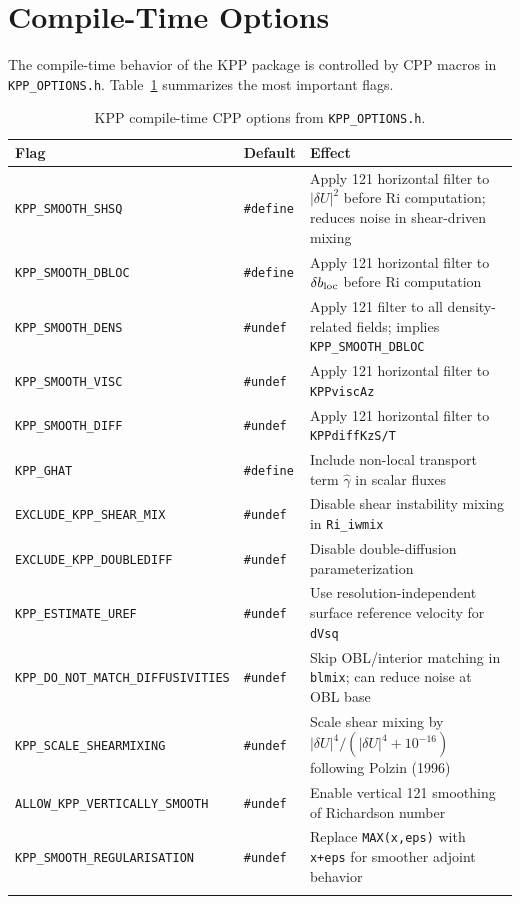 \documentclass[12pt,letterpaper]{article}
\newcommand{\ghat}{\hat{\gamma}}
\begin{document}
\section{Compile-Time Options}  
  
The compile-time behavior of the KPP package is controlled by CPP  
macros in \texttt{KPP\_OPTIONS.h}. Table~\ref{tab:cppflags} summarizes  
the most important flags.  
  
\begin{longtable}{p{5cm} l p{5cm}}  
\toprule  
\textbf{Flag} & \textbf{Default} & \textbf{Effect} \\  
\midrule  
\endhead  
\texttt{KPP\_SMOOTH\_SHSQ} & \texttt{\#define} &  
  Apply 121 horizontal filter to $|\delta U|^2$ before Ri computation;  
  reduces noise in shear-driven mixing \\[4pt]  
\texttt{KPP\_SMOOTH\_DBLOC} & \texttt{\#define} &  
  Apply 121 horizontal filter to $\delta b_{\rm loc}$ before Ri  
  computation \\[4pt]  
\texttt{KPP\_SMOOTH\_DENS} & \texttt{\#undef} &  
  Apply 121 filter to all density-related fields; implies  
  \texttt{KPP\_SMOOTH\_DBLOC} \\[4pt]  
\texttt{KPP\_SMOOTH\_VISC} & \texttt{\#undef} &  
  Apply 121 horizontal filter to \texttt{KPPviscAz} \\[4pt]  
\texttt{KPP\_SMOOTH\_DIFF} & \texttt{\#undef} &  
  Apply 121 horizontal filter to \texttt{KPPdiffKzS/T} \\[4pt]  
\texttt{KPP\_GHAT} & \texttt{\#define} &  
  Include non-local transport term $\ghat$ in scalar fluxes \\[4pt]  
\texttt{EXCLUDE\_KPP\_SHEAR\_MIX} & \texttt{\#undef} &  
  Disable shear instability mixing in \texttt{Ri\_iwmix} \\[4pt]  
\texttt{EXCLUDE\_KPP\_DOUBLEDIFF} & \texttt{\#undef} &  
  Disable double-diffusion parameterization \\[4pt]  
\texttt{KPP\_ESTIMATE\_UREF} & \texttt{\#undef} &  
  Use resolution-independent surface reference velocity for \texttt{dVsq} \\[4pt]  
\texttt{KPP\_DO\_NOT\_MATCH\_DIFFUSIVITIES} & \texttt{\#undef} &  
  Skip OBL/interior matching in \texttt{blmix}; can reduce noise at OBL base \\[4pt]  
\texttt{KPP\_SCALE\_SHEARMIXING} & \texttt{\#undef} &  
  Scale shear mixing by $|\delta U|^4/(|\delta U|^4 + 10^{-16})$  
  following Polzin (1996) \\[4pt]  
\texttt{ALLOW\_KPP\_VERTICALLY\_SMOOTH} & \texttt{\#undef} &  
  Enable vertical 121 smoothing of Richardson number \\[4pt]  
\texttt{KPP\_SMOOTH\_REGULARISATION} & \texttt{\#undef} &  
  Replace \texttt{MAX(x,eps)} with \texttt{x+eps} for smoother  
  adjoint behavior \\  
\bottomrule  
\caption{KPP compile-time CPP options from \texttt{KPP\_OPTIONS.h}.}  
\label{tab:cppflags}  
\end{longtable}  
  
\end{document}
